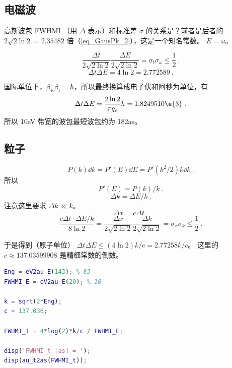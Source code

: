 
\subsection{电磁波}
高斯波包 FWHMI （用 $\Delta$ 表示）和标准差 $\sigma$ 的关系是？前者是后者的 $2\sqrt{2\ln 2} = 2.35482$ 倍（\autoref{eq_GausPk_2}），这是一个知名常数。
$E = \omega$。

\begin{equation}
\frac{\Delta t}{2\sqrt{2\ln 2}}\frac{\Delta E}{2\sqrt{2\ln 2}} = \sigma_t \sigma_\omega \leq \frac{1}{2}~.
\end{equation}
\begin{equation}
\Delta t\Delta E = 4\ln 2 = 2.772589~.
\end{equation}

国际单位下，$\beta_E\beta_t = \hbar$，所以最终换算成电子伏和阿秒为单位，有
\begin{equation}
\Delta t \Delta E  = \frac{2\ln 2}{\pi q_e}h = 1.8249510\e{3}~.
\end{equation}
所以 10eV 带宽的波包最短波包约为 182as。

\subsection{粒子}
\begin{equation}
P(k)\dd{k} = P'(E)\dd{E} = P'(k^2/2)k\dd{k}~.
\end{equation}
所以
\begin{equation}
P'(E) = P(k)/k~.
\end{equation}
\begin{equation}
\Delta k = \Delta E/k~.
\end{equation}
注意这里要求 $\Delta k \ll k$。
\begin{equation}
\Delta x = c\Delta t~.
\end{equation}
\begin{equation}
\frac{c\Delta t \cdot \Delta E/k}{8\ln 2} = \frac{\Delta x}{2\sqrt{2\ln 2}}\frac{\Delta k}{2\sqrt{2\ln 2}} = \sigma_x \sigma_k \leq \frac{1}{2}~.
\end{equation}

于是得到（原子单位） $\Delta t\Delta E \leq (4\ln 2)k/c = 2.77258 k/c$。 这里的 $c \approx 137.03599908$ 是精细常数的倒数。

\begin{lstlisting}[language=matlab]
% 以上计算的 Matlab 代码
Eng = eV2au_E(143); % 83
FWHMI_E = eV2au_E(20); % 10

k = sqrt(2*Eng);
c = 137.036;

FWHMI_t = 4*log(2)*k/c / FWHMI_E;

disp('FWHMI_t [as] = ');
disp(au_t2as(FWHMI_t));
\end{lstlisting}
